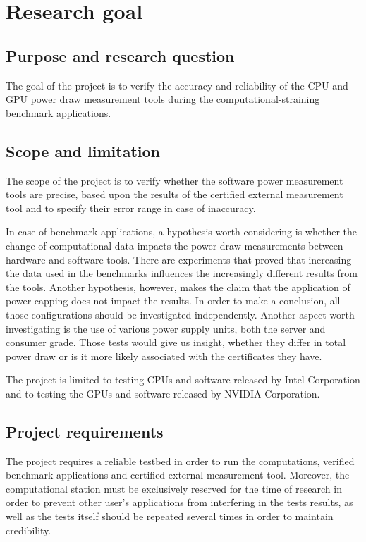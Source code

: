 \chapter*{Research goal}

\section*{Purpose and research question}

The goal of the project is to verify the accuracy and
reliability of the CPU and GPU power draw measurement
tools during the computational-straining benchmark applications.

\section*{Scope and limitation}

The scope of the project is to verify whether the software
power measurement tools are precise, based upon the results
of the certified external measurement tool and to specify
their error range in case of inaccuracy.

In case of benchmark applications, a hypothesis worth
considering is whether the change of computational data
impacts the power draw measurements between hardware and
software tools. There are
experiments that proved that increasing
the data used in the benchmarks influences the increasingly
different results from the tools. Another hypothesis, however,
makes the claim that the application of power capping does
not impact the results. In order to make a conclusion, all
those configurations should be investigated independently.
Another aspect worth investigating is the use of various
power supply units, both the server and consumer grade. Those
tests would give us insight, whether they differ in total
power draw or is it more likely associated with the certificates
they have.

The project is limited to testing CPUs and software released
by Intel Corporation and to testing the GPUs and software
released by NVIDIA Corporation.

\section*{Project requirements}

The project requires a reliable testbed in order to run the
computations, verified benchmark applications and certified
external measurement tool. Moreover, the computational station
must be exclusively reserved for the time of research in order
to prevent other user's applications from interfering in the
tests results, as well as the tests itself should be repeated
several times in order to maintain credibility.

